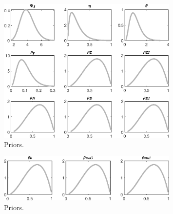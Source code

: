 \begin{figure}[H]
\centering
\includegraphics[width=0.80\textwidth]{BRS_aggregate/graphs/BRS_aggregate_Priors4}
\caption{Priors.}\label{Fig:Priors:4}
\end{figure}
\begin{figure}[H]
\centering
\includegraphics[width=0.80\textwidth]{BRS_aggregate/graphs/BRS_aggregate_Priors5}
\caption{Priors.}\label{Fig:Priors:5}
\end{figure}
 
